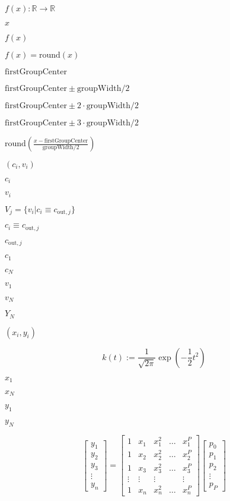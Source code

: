 \documentclass{article}
\begin{document}
$ f(x): \mathbb{R}\rightarrow\mathbb{R} $
\pagebreak

$ x $
\pagebreak

$ f(x) $
\pagebreak

$ f(x)=\mbox{round}(x) $
\pagebreak

$ \mbox{firstGroupCenter} $
\pagebreak

$ \mbox{firstGroupCenter}\pm\mbox{groupWidth}/2$
\pagebreak

$ \mbox{firstGroupCenter}\pm2\cdot\mbox{groupWidth}/2 $
\pagebreak

$ \mbox{firstGroupCenter}\pm3\cdot\mbox{groupWidth}/2 $
\pagebreak

$ \mbox{round}\left(\frac{x-\mbox{firstGroupCenter}}{\mbox{groupWidth}/2}\right) $
\pagebreak

$ (c_i,v_i) $
\pagebreak

$ c_i $
\pagebreak

$ v_i $
\pagebreak

$ V_j=\{v_{i}|c_i\equiv c_{\text{out},j}\} $
\pagebreak

$ c_i\equiv c_{\text{out},j} $
\pagebreak

$ c_{\text{out},j} $
\pagebreak

$ c_1 $
\pagebreak

$ c_N $
\pagebreak

$ v_1 $
\pagebreak

$ v_N $
\pagebreak

$ Y_N $
\pagebreak

$ (x_i,y_i) $
\pagebreak

\[ k(t):=\frac{1}{\sqrt{2\pi}}\exp \left(-\frac{1}{2}t^2\right) \]
\pagebreak

$ x_1 $
\pagebreak

$ x_N $
\pagebreak

$ y_1 $
\pagebreak

$ y_N $
\pagebreak

\[ \begin{bmatrix} y_1\\ y_2\\ y_3 \\ \vdots \\ y_n \end{bmatrix}= \begin{bmatrix} 1 & x_1 & x_1^2 & \dots & x_1^P \\ 1 & x_2 & x_2^2 & \dots & x_2^P\\ 1 & x_3 & x_3^2 & \dots & x_3^P \\ \vdots & \vdots & \vdots & & \vdots \\ 1 & x_n & x_n^2 & \dots & x_n^P \end{bmatrix} \begin{bmatrix} p_0\\ p_1\\ p_2\\ \vdots \\ p_P \end{bmatrix} \]
\pagebreak
\end{document}

